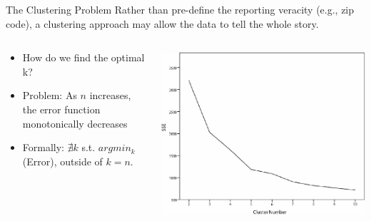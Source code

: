 \begin{frame}{The Clustering Problem}
    Rather than pre-define the reporting veracity (e.g., zip code), a clustering approach may allow the data to tell the whole story. 
    \vspace{5pt}

  \begin{columns}
      \begin{column}{0.6\linewidth}
      \begin{itemize}
          \item How do we find the optimal k?
          \vspace{-7pt}
          \item Problem: As $n$ increases, the error function monotonically decreases
          \vspace{-7pt}
          \item Formally: $\nexists k$ s.t. $argmin_{k}$(Error), outside of $k = n$. 
      \end{itemize}
    \end{column}
    \begin{column}{0.45\linewidth}
        \includegraphics[scale = 0.21]{figures/sse_cluster-n_tradeoff.jpg}\\
    \end{column}
  \end{columns}
\end{frame}

